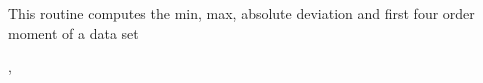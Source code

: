 
\sloppy


 \section[compute\_statistics*]{ }
\label{sub:compute_statistics}
\author{Eric Hivon}

\newcommand{\myskip}{\hskip 1cm}

\begin{facility}
{This routine computes the min, max, absolute deviation and first four order moment of a data set}
{\modStatistics}
\end{facility}

\begin{f90format}
{%
 ,%
 }
\end{f90format}
\aboutoptional

